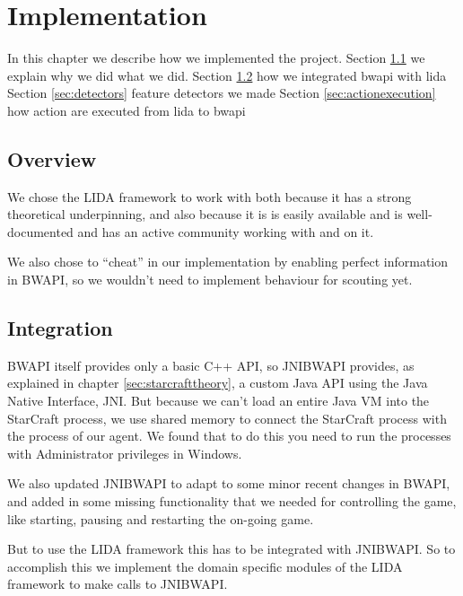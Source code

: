 
\chapter{Implementation}
In this chapter we describe how we implemented the project.
Section \ref{sec:overview} we explain why we did what we did.
Section \ref{sec:integration} how we integrated bwapi with lida
Section \ref{sec:detectors} feature detectors we made
Section \ref{sec:actionexecution} how action are executed from lida to bwapi

\section{Overview} 
\label{sec:overview}
We chose the LIDA framework to work with both because it has a strong theoretical underpinning, and also because it is is easily available and is well-documented and has an active community working with and on it.

We also chose to ``cheat'' in our implementation by enabling perfect information in BWAPI, so we wouldn't need to implement behaviour for scouting yet.

\section{Integration}
\label{sec:integration}
BWAPI itself provides only a basic C++ API, so JNIBWAPI provides, as explained in chapter \ref{sec:starcrafttheory}, a custom Java API using the Java Native Interface, JNI.\cite{jni} But because we can't load an entire Java VM into the StarCraft process, we use shared memory to connect the StarCraft process with the process of our agent. We found that to do this you need to run the processes with Administrator privileges in Windows.

We also updated JNIBWAPI to adapt to some minor recent changes in BWAPI, and added in some missing functionality that we needed for controlling the game, like starting, pausing and restarting the on-going game.

But to use the LIDA framework this has to be integrated with JNIBWAPI. So to accomplish this we implement the domain specific modules of the LIDA framework to make calls to JNIBWAPI. 


